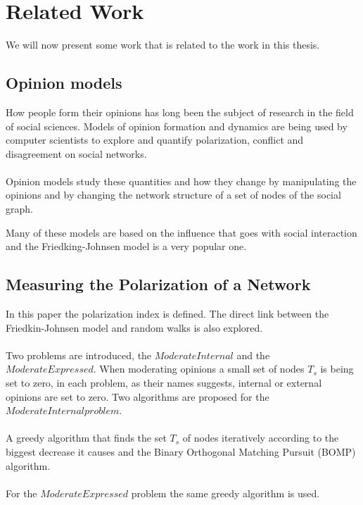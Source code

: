\chapter{Related Work}
\label{ch:Instructions}

We will now present some work that is related to the work in this thesis. 

\section{Opinion models}
\label{sec:opinionsModels}

How people form their opinions has long been the subject of research in the field of social sciences. Models of opinion formation and dynamics are being used  by computer scientists to explore and quantify polarization, conflict and disagreement on social networks.
\\
\\
Opinion models study these quantities and how they change by manipulating the opinions and by changing the network structure of a set of nodes of the social graph.

\clearpage
\noindent Many of these models are based on the influence that goes with social interaction and the Friedking-Johnsen model is a very popular one.

\section{Measuring the Polarization of a Network}
\label{sec:Submission}

In this paper the polarization index is defined. The direct link between the Friedkin-Johnsen model and random walks is also explored. 
\\
\\
Two problems are introduced, the $ModerateInternal$ and the $ModerateExpressed$. When moderating opinions a small set of nodes $T_s$ is being set to zero, in each problem, as their names suggests, internal or external opinions are set to zero. Two algorithms are proposed for the $ModerateInternal problem$. 
\\
\\
A greedy algorithm that finds the set $T_s$ of nodes iteratively according to the biggest decrease it causes and the Binary Orthogonal Matching Pursuit (BOMP) algorithm. 
\\
\\
For the $ModerateExpressed$ problem the same greedy algorithm is used.
\cite{tsapMatakosTerzi}


